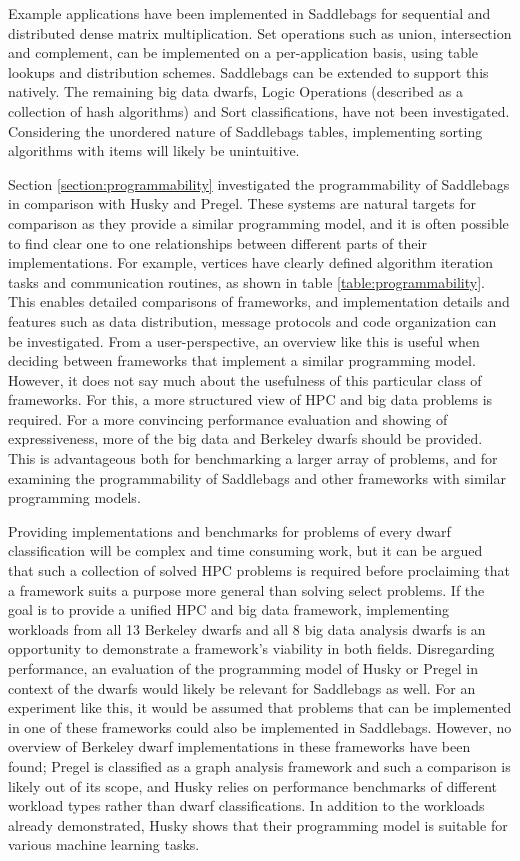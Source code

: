 \documentclass{uit-report}
\begin{document}
\newpage
Example applications have been implemented in Saddlebags for sequential and distributed dense matrix multiplication. Set operations such as union, intersection and complement, can be implemented on a per-application basis, using table lookups and distribution schemes. Saddlebags can be extended to support this natively. The remaining big data dwarfs, Logic Operations (described as a collection of hash algorithms) and Sort classifications, have not been investigated. Considering the unordered nature of Saddlebags tables, implementing sorting algorithms with items will likely be unintuitive.

Section \ref{section:programmability} investigated the programmability of Saddlebags in comparison with Husky and Pregel. These systems are natural targets for comparison as they provide a similar programming model, and it is often possible to find clear one to one relationships between different parts of their implementations. For example, vertices have clearly defined algorithm iteration tasks and communication routines, as shown in table \ref{table:programmability}. This enables detailed comparisons of frameworks, and implementation details and features such as data distribution, message protocols and code organization can be investigated. From a user-perspective, an overview like this is useful when deciding between frameworks that implement a similar programming model. However, it does not say much about the usefulness of this particular class of frameworks. For this, a more structured view of HPC and big data problems is required. For a more convincing performance evaluation and showing of expressiveness, more of the big data and Berkeley dwarfs should be provided. This is advantageous both for benchmarking a larger array of problems, and for examining the programmability of Saddlebags and other frameworks with similar programming models. 

Providing implementations and benchmarks for problems of every dwarf classification will be complex and time consuming work, but it can be argued that such a collection of solved HPC problems is required before proclaiming that a framework suits a purpose more general than solving select problems. If the goal is to provide a unified HPC and big data framework, implementing workloads from all 13 Berkeley dwarfs and all 8 big data analysis dwarfs is an opportunity to demonstrate a framework's viability in both fields. Disregarding performance, an evaluation of the programming model of Husky or Pregel in context of the dwarfs would likely be relevant for Saddlebags as well. For an experiment like this, it would be assumed that problems that can be implemented in one of these frameworks could also be implemented in Saddlebags. However, no overview of Berkeley dwarf implementations in these frameworks have been found; Pregel is classified as a graph analysis framework and such a comparison is likely out of its scope, and Husky relies on performance benchmarks of different workload types rather than dwarf classifications. In addition to the workloads already demonstrated, Husky shows that their programming model is suitable for various machine learning tasks.
\end{document}
